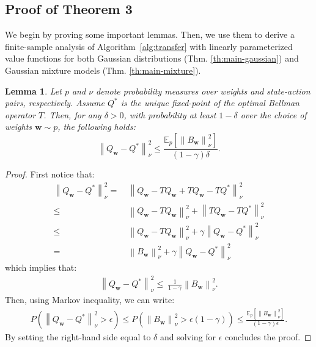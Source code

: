 \documentclass{article}
\newtheorem{lemma}{Lemma}
\newcommand{\norm}[1]{\left\lVert #1 \right\rVert}
\begin{document}
\subsection{Proof of Theorem 3}

We begin by proving some important lemmas. Then, we use them to derive a finite-sample analysis of Algorithm~\ref{alg:transfer} with linearly parameterized value functions for both Gaussian distributions (Thm. \ref{th:main-gaussian}) and Gaussian mixture models (Thm. \ref{th:main-mixture}).

\begin{lemma}\label{lemma:l1}
Let $p$ and $\nu$ denote probability measures over weights and state-action pairs, respectively. Assume $Q^*$ is the unique fixed-point of the optimal Bellman operator $T$. Then, for any $\delta > 0$, with probability at least $1 - \delta$ over the choice of weights $\bm{w} \sim p$, the following holds:
\begin{equation}
\norm{Q_{\bm{w}} - Q^*}_{\nu}^2 \leq \frac{\mathbb{E}_p\left[ \norm{B_{\bm{w}}}_{\nu}^2 \right]}{(1-\gamma)\delta}.
\end{equation}
\end{lemma}
\begin{proof}
First notice that:
\begin{align*}
\norm{Q_{\bm{w}} - Q^*}_{\nu}^2 =\ & \norm{Q_{\bm{w}} - TQ_{\bm{w}} + TQ_{\bm{w}} - TQ^*}_{\nu}^2\\ \leq\ & \norm{Q_{\bm{w}} - TQ_{\bm{w}}}_{\nu}^2 + \norm{TQ_{\bm{w}} - TQ^*}_{\nu}^2\\ \leq\ & \norm{Q_{\bm{w}} - TQ_{\bm{w}}}_{\nu}^2 + \gamma\norm{Q_{\bm{w}} - Q^*}_{\nu}^2\\ =\ & \norm{B_{\bm{w}}}_{\nu}^2 + \gamma\norm{Q_{\bm{w}} - Q^*}_{\nu}^2
\end{align*}
which implies that:
\begin{align*}
\norm{Q_{\bm{w}} - Q^*}_{\nu}^2 \leq\ \frac{1}{1-\gamma}\norm{B_{\bm{w}}}_{\nu}^2.
\end{align*}
Then, using Markov inequality, we can write:
\begin{align*}
P\left( \norm{Q_{\bm{w}} - Q^*}_{\nu}^2 > \epsilon \right) \leq P\left(\norm{B_{\bm{w}}}_{\nu}^2 > \epsilon (1-\gamma)\right) \leq \frac{\mathbb{E}_p\left[ \norm{B_{\bm{w}}}_{\nu}^2 \right]}{(1-\gamma)\epsilon}.
\end{align*}
By setting the right-hand side equal to $\delta$ and solving for $\epsilon$ concludes the proof.
\end{proof}
\end{document}
